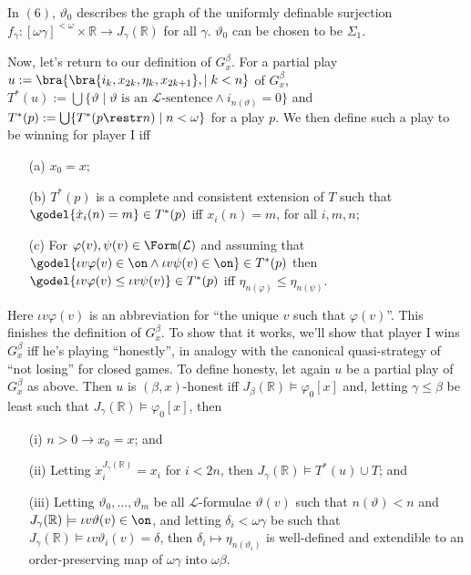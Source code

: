 {In $(6)$, $\vartheta_0$ describes the graph of the uniformly definable surjection $f_\gamma:[\omega\gamma]^{<\omega}\times\mathbb R\to J_\gamma(\mathbb R)$ for all $\gamma$. $\vartheta_0$ can be chosen to be $\Sigma_1$.

\qquad Now, let's return to our definition of $G_x^\beta$. For a partial play $u:=\bra{\bra{i_k,x_{2k},\eta_k,x_{2k+1}},\mid k<n}$ of $G_x^\beta$, $T^*(u):=\bigcup\{\vartheta\mid\vartheta\text{ is an $\mathcal L$-sentence}\land i_{n(\vartheta)}=0\}$ and $T^*(p):=\bigcup\{T^*(p\restr n)\mid n<\omega\}$ for a play $p$. We then define such a play to be winning for player I iff
\begin{enumerate}
	\item[(a)] $x_0=x$;
	\item[(b)] $T^*(p)$ is a complete and consistent extension of $T$ such that $\godel{\dot x_i(n)=m}\in T^*(p)$ iff $x_i(n)=m$, for all $i,m,n$;
	\item[(c)] For $\varphi(v),\psi(v)\in\Form(\mathcal L)$ and assuming that $\godel{\iota v\varphi(v)\in\on\land\iota v\psi(v)\in\on}\in T^*(p)$ then $\godel{\iota v\varphi(v)\leq\iota v\psi(v)}\in T^*(p)$ iff $\eta_{n(\varphi)}\leq\eta_{n(\psi)}$.\\
\end{enumerate}

Here $\iota v\varphi(v)$ is an abbreviation for ``the unique $v$ such that $\varphi(v)$''. This finishes the definition of $G_x^\beta$. To show that it works, we'll show that player I wins $G_x^\beta$ iff he's playing ``honestly'', in analogy with the canonical quasi-strategy of ``not losing'' for closed games. To define honesty, let again $u$ be a partial play of $G_x^\beta$ as above. Then $u$ is $(\beta,x)$-honest iff $J_\beta(\mathbb R)\models\varphi_0[x]$ and, letting $\gamma\leq\beta$ be least such that $J_\gamma(\mathbb R)\models\varphi_0[x]$, then
\begin{enumerate}
	\item[(i)] $n>0\to x_0=x$; and
	\item[(ii)] Letting $\dot x_i^{J_\gamma(\mathbb R)}=x_i$ for $i<2n$, then $J_\gamma(\mathbb R)\models T^*(u)\cup T$; and
	\item[(iii)] Letting $\vartheta_0,\dots,\vartheta_m$ be all $\mathcal L$-formulae $\vartheta(v)$ such that $n(\vartheta)<n$ and $J_\gamma(\mathbb R)\models\iota v\vartheta(v)\in\on$, and letting $\delta_i<\omega\gamma$ be such that $J_\gamma(\mathbb R)\models\iota v\vartheta_i(v)=\delta$, then $\delta_i\mapsto\eta_{n(\vartheta_i)}$ is well-defined and extendible to an order-preserving map of $\omega\gamma$ into $\omega\beta$.
\end{enumerate}

}
